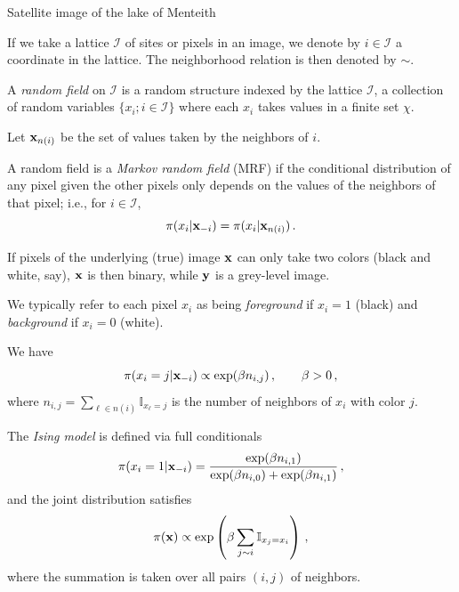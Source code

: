 \begin{slide}
\footnotesize \begin{center}Satellite image of the lake of Menteith\end{center}

\end{slide}\begin{slide}

If we take a lattice $\mathcal{I}$ of sites or pixels in an image, we denote by
$i\in\mathcal{I}$ a coordinate in the lattice.  The neighborhood relation is then denoted by $\sim$. 

\vs \pause A {\em random field} on $\mathcal{I}$ is a random structure indexed by the lattice $\mathcal{I}$, a
collection of random variables $\{x_i;i\in\mathcal{I}\}$ where each
$x_i$ takes values in a finite set $\chi$. 

\end{slide}\begin{slide}

Let $\mathbf{x}_{n(i)}$ be the set of values taken by the neighbors of $i$. 

\vs \pause A random field is a {\em Markov random field} (MRF) if the conditional distribution of any pixel given the
other pixels only depends on the values of the neighbors of that pixel; i.e., for $i\in\mathcal{I}$,
$$
\pi(x_i|\mathbf{x}_{-i})=\pi(x_i|\mathbf{x}_{n(i)})\,.
$$

\end{slide}\begin{slide}

If pixels of the underlying (true) image $\mathbf{x}$ can only take two
colors (black and white, say), $\mathbf{x}$ is then binary, while $\mathbf{y}$ is
a grey-level image.

\vs \pause We typically refer to each pixel $x_i$ as being {\em foreground}
if $x_i=1$ (black) and {\em background} if $x_i=0$ (white).

\vs \pause We have 
$$
\pi(x_i=j|\mathbf{x}_{-i})\propto \exp(\beta n_{i,j})\,,\qquad\beta>0\,,
$$
where $n_{i,j}=\sum_{\ell\in n(i)}\mathbb{I}_{x_\ell=j}$ is the
number of neighbors of $x_i$ with color $j$. 

\end{slide}\begin{slide}

The {\em Ising model} is defined via full conditionals
$$
\pi(x_i=1|\mathbf{x}_{-i})=\frac{\exp(\beta n_{i,1})}{\exp(\beta n_{i,0})+\exp(\beta n_{i,1})}\,,
$$
\pause and the joint distribution satisfies
$$
\pi(\mathbf{x})\propto \exp\left(\beta \sum_{j\sim i} \mathbb{I}_{x_j=x_i}\right)\,,
$$
where the summation is taken over all pairs $(i,j)$ of neighbors.


\end{slide}
